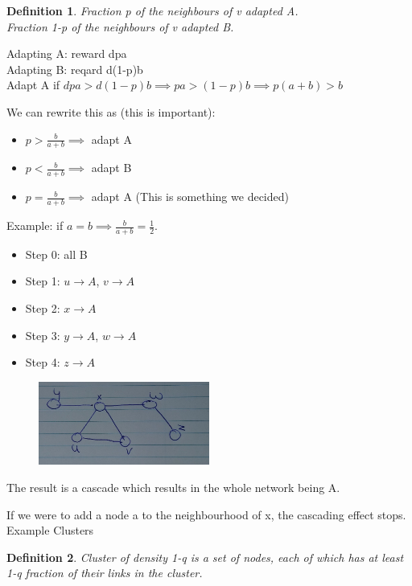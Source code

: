 \documentclass[12pt]{scrartcl}
\newtheorem{defi}{Definition}
\begin{document}
\begin{defi}
	Fraction p of the neighbours of v adapted A.\\
	Fraction 1-p of the neighbours of v adapted B.
\end{defi}

Adapting A: reward dpa\\
Adapting B: reqard d(1-p)b\\


Adapt A if $dpa > d(1-p)b \implies pa > (1-p)b \implies p(a+b) > b$

We can rewrite this as (this is important):
\begin{itemize}
\item $p > \frac{b}{a+b} \implies$ adapt A
\item $p < \frac{b}{a+b} \implies$ adapt B
\item $p = \frac{b}{a+b} \implies$ adapt A (This is something we decided)
\end{itemize}

\noindent Example: if $a = b \implies \frac{b}{a+b} = \frac{1}{2}$.
  
\begin{itemize}
\item Step 0: all B
\item Step 1: $u \rightarrow A$, $v \rightarrow A$
\item Step 2: $x \rightarrow A$
\item Step 3: $y \rightarrow A$, $w \rightarrow A$
\item Step 4: $z \rightarrow A$
\end{itemize}

\begin{figure}[h]
	\centering
	\includegraphics[width=0.5\textwidth]{./images/fig3.jpg}
\end{figure}

The result is a cascade which results in the whole network being A.

If we were to add a node a to the neighbourhood of x, the cascading effect stops.\\


Example Clusters
\begin{defi}
	Cluster of density 1-q is a set of nodes, each of which has at least 1-q fraction of their links in the cluster.
\end{defi}
\end{document}

